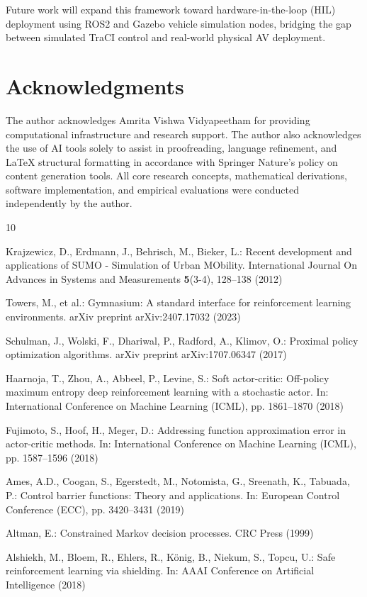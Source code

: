 \documentclass{svproc}
\begin{document}
Future work will expand this framework toward hardware-in-the-loop (HIL) deployment using ROS2 and Gazebo vehicle simulation nodes, bridging the gap between simulated TraCI control and real-world physical AV deployment.

\section*{Acknowledgments}
The author acknowledges Amrita Vishwa Vidyapeetham for providing computational infrastructure and research support. The author also acknowledges the use of AI tools solely to assist in proofreading, language refinement, and LaTeX structural formatting in accordance with Springer Nature's policy on content generation tools. All core research concepts, mathematical derivations, software implementation, and empirical evaluations were conducted independently by the author.

\begin{thebibliography}{10}

Krajzewicz, D., Erdmann, J., Behrisch, M., Bieker, L.: Recent development and applications of SUMO - Simulation of Urban MObility. International Journal On Advances in Systems and Measurements \textbf{5}(3-4), 128--138 (2012)

Towers, M., et al.: Gymnasium: A standard interface for reinforcement learning environments. arXiv preprint arXiv:2407.17032 (2023)

Schulman, J., Wolski, F., Dhariwal, P., Radford, A., Klimov, O.: Proximal policy optimization algorithms. arXiv preprint arXiv:1707.06347 (2017)

Haarnoja, T., Zhou, A., Abbeel, P., Levine, S.: Soft actor-critic: Off-policy maximum entropy deep reinforcement learning with a stochastic actor. In: International Conference on Machine Learning (ICML), pp. 1861--1870 (2018)

Fujimoto, S., Hoof, H., Meger, D.: Addressing function approximation error in actor-critic methods. In: International Conference on Machine Learning (ICML), pp. 1587--1596 (2018)

Ames, A.D., Coogan, S., Egerstedt, M., Notomista, G., Sreenath, K., Tabuada, P.: Control barrier functions: Theory and applications. In: European Control Conference (ECC), pp. 3420--3431 (2019)

Altman, E.: Constrained Markov decision processes. CRC Press (1999)

Alshiekh, M., Bloem, R., Ehlers, R., K\"{o}nig, B., Niekum, S., Topcu, U.: Safe reinforcement learning via shielding. In: AAAI Conference on Artificial Intelligence (2018)

\end{thebibliography}
\end{document}
